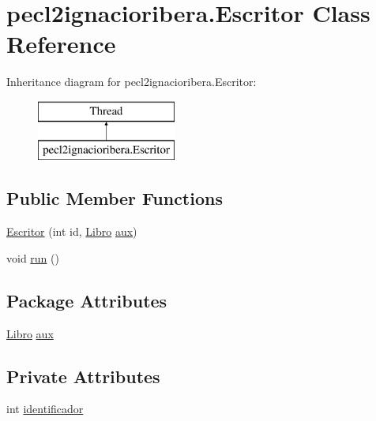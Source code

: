 \hypertarget{classpecl2ignacioribera_1_1_escritor}{}\section{pecl2ignacioribera.\+Escritor Class Reference}
\label{classpecl2ignacioribera_1_1_escritor}
Inheritance diagram for pecl2ignacioribera.\+Escritor\+:\begin{figure}[H]
\begin{center}
\leavevmode
\includegraphics[height=2.000000cm]{classpecl2ignacioribera_1_1_escritor}
\end{center}
\end{figure}
\subsection*{Public Member Functions}
\begin{DoxyCompactItemize}
\item 
\mbox{\hyperlink{classpecl2ignacioribera_1_1_escritor_a8ce7faa85a696b534b796fa339f8716b}{Escritor}} (int id, \mbox{\hyperlink{classpecl2ignacioribera_1_1_libro}{Libro}} \mbox{\hyperlink{classpecl2ignacioribera_1_1_escritor_ab1609b43aaa7b7fd72926798e8382b14}{aux}})
\item 
void \mbox{\hyperlink{classpecl2ignacioribera_1_1_escritor_afa4376cb9e3eec9b801eeb0d999f920a}{run}} ()
\end{DoxyCompactItemize}
\subsection*{Package Attributes}
\begin{DoxyCompactItemize}
\item 
\mbox{\hyperlink{classpecl2ignacioribera_1_1_libro}{Libro}} \mbox{\hyperlink{classpecl2ignacioribera_1_1_escritor_ab1609b43aaa7b7fd72926798e8382b14}{aux}}
\end{DoxyCompactItemize}
\subsection*{Private Attributes}
\begin{DoxyCompactItemize}
\item 
int \mbox{\hyperlink{classpecl2ignacioribera_1_1_escritor_a99af112e84645111c4d03268058170ee}{identificador}}
\end{DoxyCompactItemize}


